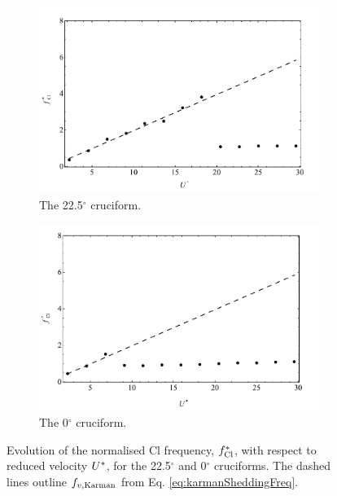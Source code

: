 \documentclass[oneside]{utmthesis}
\begin{document}
\begin{figure}
  \centering
  \begin{subfigure}[h]{1\textwidth}
    \includegraphics[width=\textwidth]{figs/clFreq2}
    \caption{The 22.5$^{\circ}$ cruciform.}
    \label{fig:clFreq2}
  \end{subfigure}
  
  \begin{subfigure}[h]{1\textwidth}
    \includegraphics[width=\textwidth]{figs/clFreq1}
    \caption{The 0$^{\circ}$ cruciform.}
    \label{fig:clFreq1}
  \end{subfigure}

  \label{fig:clFreq21}
  \caption{Evolution of the normalised Cl frequency, $f_{\text{Cl}}^{*}$, with respect to reduced velocity $U^{*}$, for the 22.5$^{\circ}$ and 0$^{\circ}$ cruciforms. The dashed lines outline $f_{v,\text{Karman}}$ from Eq. \ref{eq:karmanSheddingFreq}.} 
\end{figure}
\end{document}
